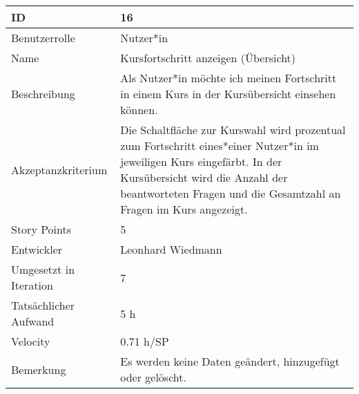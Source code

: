 \begin{tabularx}{\textwidth}{|p{}|X|}
	\hline
	ID & 16\\
	\hline
	Benutzerrolle & Nutzer*in\\
	\hline
	Name & Kursfortschritt anzeigen (Übersicht)\\
	\hline
	Beschreibung & Als Nutzer*in möchte ich meinen Fortschritt in einem Kurs in der Kursübersicht einsehen können.\\
	\hline
	Akzeptanzkriterium & Die Schaltfläche zur Kurswahl wird prozentual zum Fortschritt eines*einer Nutzer*in im jeweiligen Kurs eingefärbt. In der Kursübersicht wird die Anzahl der beantworteten Fragen und die Gesamtzahl an Fragen im Kurs angezeigt.\\
	\hline
	Story Points & 5\\
	\hline
	Entwickler & Leonhard Wiedmann\\
	\hline
	Umgesetzt in Iteration & 7\\
	\hline
	Tatsächlicher Aufwand & 5 h\\
	\hline
	Velocity & 0.71 h/SP\\
	\hline
	Bemerkung & Es werden keine Daten geändert, hinzugefügt oder gelöscht.\\
	\hline
\end{tabularx}
\vspace{20pt}

